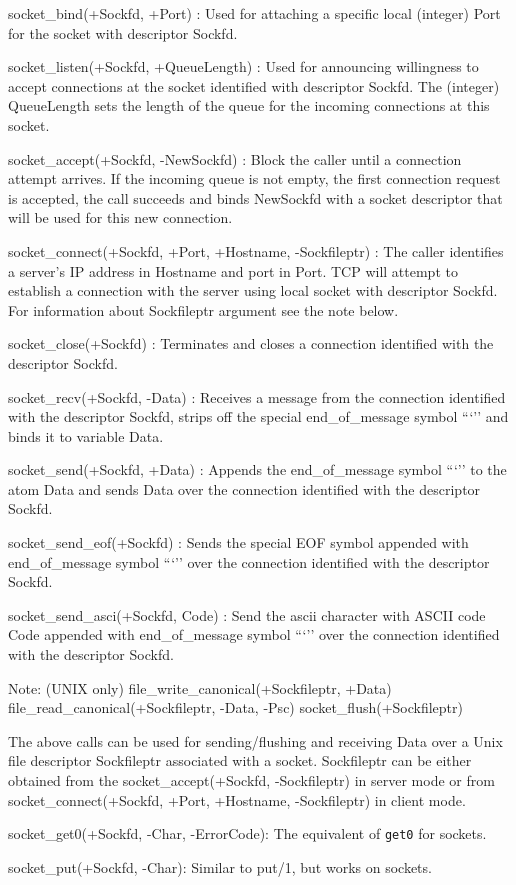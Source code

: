 {socket_bind(+Sockfd, +Port) :
Used for attaching a specific local (integer) Port for the socket with
descriptor Sockfd.

socket_listen(+Sockfd, +QueueLength) :
Used for announcing willingness to accept connections at the socket identified
with descriptor Sockfd. The (integer) QueueLength sets the length of the queue
for the incoming connections at this socket.

socket_accept(+Sockfd, -NewSockfd) :
Block the caller until a connection attempt arrives. If the incoming queue is
not empty, the first connection request is accepted, the call succeeds and
binds NewSockfd with a socket descriptor that will be used for this new
connection.

socket_connect(+Sockfd, +Port, +Hostname, -Sockfileptr) :
The caller identifies a server's IP address in Hostname and port in Port.
TCP will attempt to establish a connection with the server using local socket
with descriptor Sockfd. For information about Sockfileptr argument see the
note below.

socket_close(+Sockfd) :
Terminates and closes a connection identified with the descriptor Sockfd.

socket_recv(+Sockfd, -Data) :
Receives a message from the connection identified with the descriptor Sockfd,
strips off the special end_of_message symbol ```'' and binds it to variable Data.

socket_send(+Sockfd, +Data) :
Appends the end_of_message symbol ```'' to the atom Data and sends Data over
the connection identified with the descriptor Sockfd.

socket_send_eof(+Sockfd) :
Sends the special EOF symbol appended with end_of_message symbol ```'' over
the connection identified with the descriptor Sockfd.

socket_send_asci(+Sockfd, Code) :
Send the ascii character with ASCII code Code appended with end_of_message
symbol ```''  over the connection identified with the descriptor Sockfd.


Note: (UNIX only) file_write_canonical(+Sockfileptr, +Data)
		  file_read_canonical(+Sockfileptr, -Data, -Psc) 
		  socket_flush(+Sockfileptr)

The above calls can be used for sending/flushing and receiving Data over a
Unix file descriptor Sockfileptr associated with a socket. Sockfileptr can be
either obtained from the socket_accept(+Sockfd, -Sockfileptr) in server mode
or from socket_connect(+Sockfd, +Port, +Hostname, -Sockfileptr) in client mode.

socket_get0(+Sockfd, -Char, -ErrorCode):
The equivalent of {\tt get0} for sockets.

socket_put(+Sockfd, -Char):
Similar to put/1, but works on sockets.

}

